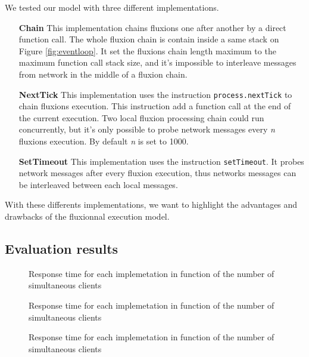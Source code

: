 We tested our model with three different implementations.

\begin{itemize}
	\item[\textbf{Chain}]
		This implementation chains fluxions one after another by a direct function call.
		The whole fluxion chain is contain inside a same stack on Figure \ref{fig:eventloop}.
		It set the fluxions chain length maximum to the maximum function call stack size, and it's impossible to interleave messages from network in the middle of a fluxion chain.

	\item[\textbf{NextTick}]
		This implementation uses the instruction \texttt{process.nextTick} to chain fluxions execution.
		This instruction add a function call at the end of the current execution.
		Two local fluxion processing chain could run concurrently, but it's only possible to probe network messages every \textit{n} fluxions execution.
		By default \textit{n} is set to 1000.

	\item[\textbf{SetTimeout}]
		This implementation uses the instruction \texttt{setTimeout}.
		It probes network messages after every fluxion execution, thus networks messages can be interleaved between each local messages.
\end{itemize}

With these differents implementations, we want to highlight the advantages and drawbacks of the fluxionnal execution model.

\subsection{Evaluation results}

\begin{figure}

\caption{Response time for each implemetation in function of the number of simultaneous clients}
\label{fig:diffinstructions}
\end{figure}

\begin{figure}

\caption{Response time for each implemetation in function of the number of simultaneous clients}
\label{fig:setTimeout}
\end{figure}

\begin{figure}

\caption{Response time for each implemetation in function of the number of simultaneous clients}
\label{fig:timecountsetTimeout}
\end{figure}

